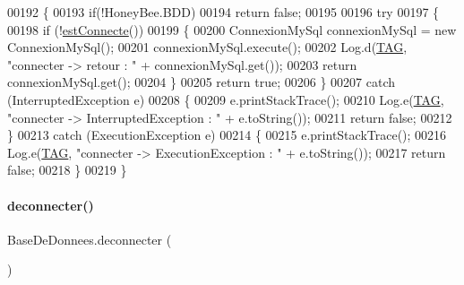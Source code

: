\begin{DoxyCode}
00192     \{
00193         \textcolor{keywordflow}{if}(!HoneyBee.BDD)
00194             \textcolor{keywordflow}{return} \textcolor{keyword}{false};
00195 
00196         \textcolor{keywordflow}{try}
00197         \{
00198             \textcolor{keywordflow}{if} (!\hyperlink{classfr_1_1campus_1_1laurainc_1_1honeybee_1_1_base_de_donnees_a735f54c2c183a595c9a9a5ba947491f5}{estConnecte}())
00199             \{
00200                 ConnexionMySql connexionMySql = \textcolor{keyword}{new} ConnexionMySql();
00201                 connexionMySql.execute();
00202                 Log.d(\hyperlink{classfr_1_1campus_1_1laurainc_1_1honeybee_1_1_base_de_donnees_ae800d867b3e423dd139e982736ab5587}{TAG}, \textcolor{stringliteral}{"connecter -> retour : "} + connexionMySql.get());
00203                 \textcolor{keywordflow}{return} connexionMySql.get();
00204             \}
00205             \textcolor{keywordflow}{return} \textcolor{keyword}{true};
00206         \}
00207         \textcolor{keywordflow}{catch} (InterruptedException e)
00208         \{
00209             e.printStackTrace();
00210             Log.e(\hyperlink{classfr_1_1campus_1_1laurainc_1_1honeybee_1_1_base_de_donnees_ae800d867b3e423dd139e982736ab5587}{TAG}, \textcolor{stringliteral}{"connecter -> InterruptedException : "} + e.toString());
00211             \textcolor{keywordflow}{return} \textcolor{keyword}{false};
00212         \}
00213         \textcolor{keywordflow}{catch} (ExecutionException e)
00214         \{
00215             e.printStackTrace();
00216             Log.e(\hyperlink{classfr_1_1campus_1_1laurainc_1_1honeybee_1_1_base_de_donnees_ae800d867b3e423dd139e982736ab5587}{TAG}, \textcolor{stringliteral}{"connecter -> ExecutionException : "} + e.toString());
00217             \textcolor{keywordflow}{return} \textcolor{keyword}{false};
00218         \}
00219     \}
\end{DoxyCode}
\mbox{\label{classfr_1_1campus_1_1laurainc_1_1honeybee_1_1_base_de_donnees_ae022ff0b4923d637f8d392cb908aa252}} 
\paragraph{\texorpdfstring{deconnecter()}{deconnecter()}}
{\footnotesize\ttfamily Base\+De\+Donnees.\+deconnecter (\begin{DoxyParamCaption}{ }\end{DoxyParamCaption})}

